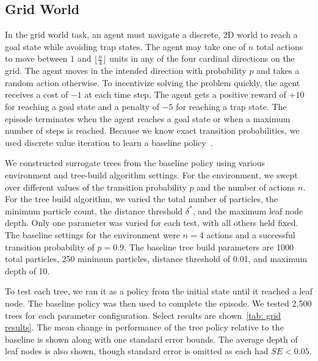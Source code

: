 \documentclass[letterpaper]{article} %
\begin{document}
\subsection{Grid World}
In the grid world task, an agent must navigate a discrete, 2D world to reach a goal state while avoiding trap states.
The agent may take one of $n$ total actions to move between $1$ and $\lfloor \frac{n}{4}\rfloor$ units in any of the four cardinal directions on the grid.
The agent moves in the intended direction with probability $p$ and takes a random action otherwise.
To incentivize solving the problem quickly, the agent receives a cost of $-1$ at each time step. 
The agent gets a positive reward of $+10$ for reaching a goal state and a penalty of $-5$ for reaching a trap state.
The episode terminates when the agent reaches a goal state or when a maximum number of steps is reached. 
Because we know exact transition probabilities, we used discrete value iteration to learn a baseline policy~\cite{sutton1998}. 

We constructed surrogate trees from the baseline policy using various environment and tree-build algorithm settings.
For the environment, we swept over different values of the transition probability $p$ and the number of actions $n$.
For the tree build algorithm, we varied the total number of particles, the minimum particle count, the distance threshold $\delta^*$, and the maximum leaf node depth. 
Only one parameter was varied for each test, with all others held fixed. 
The baseline settings for the environment were $n=4$ actions and a successful transition probability of $p=0.9$.
The baseline tree build parameters are 1000 total particles, 250 minimum particles, distance threshold of 0.01, and maximum depth of 10.

To test each tree, we ran it as a policy from the initial state until it reached a leaf node.
The baseline policy was then used to complete the episode.
We tested 2,500 trees for each parameter configuration. 
Select results are shown~\cref{tab: grid results}.
The mean change in performance of the tree policy relative to the baseline is shown along with one standard error bounds. 
The average depth of leaf nodes is also shown, though standard error is omitted as each had $SE < 0.05$.
\end{document}
